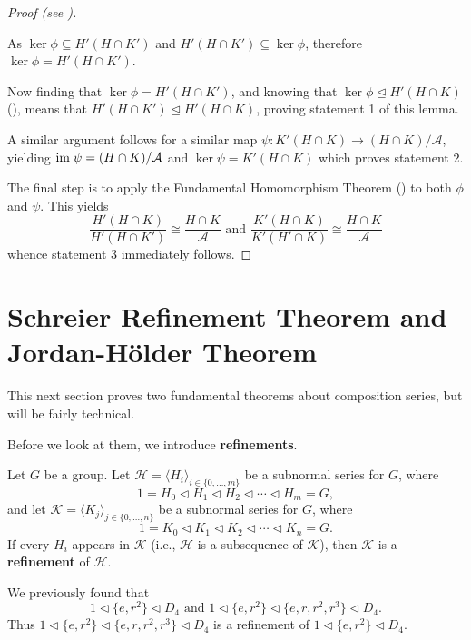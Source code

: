 \begin{proof}[Proof (see {\cite[p.~110]{hungerford_1980}})]
\begin{itemize}
        As $\ker\phi \subseteq H'(H\cap K')$ and $H'(H\cap K') \subseteq \ker\phi$, therefore $\ker\phi = H'(H \cap K')$.
    \end{itemize}
    
    Now finding that $\ker\phi = H'(H \cap K')$, and knowing that $\ker\phi \unlhd H'(H\cap K)$ (), means that $H'(H \cap K') \unlhd H'(H\cap K)$, proving statement 1 of this lemma.
    
    A similar argument follows for a similar map $\psi: K'(H\cap K) \to (H\cap K)/\mathcal{A}$, yielding $\mathrm{im}\;\psi = (H\cap K)/\mathcal{A}$ and $\ker\psi = K'(H\cap K)$ which proves statement 2.
    
    The final step is to apply the Fundamental Homomorphism Theorem () to both $\phi$ and $\psi$. This yields
    \[
        \frac{H'(H\cap K)}{H'(H\cap K')} \cong \frac{H\cap K}{\mathcal{A}} 
        \text{ and }
        \frac{K'(H\cap K)}{K'(H'\cap K)} \cong \frac{H\cap K}{\mathcal{A}}
    \]
    whence statement 3 immediately follows.
\end{proof}

\section{Schreier Refinement Theorem and Jordan-H\"older Theorem}
This next section proves two fundamental theorems about composition series, but will be fairly technical.

Before we look at them, we introduce \textbf{refinements}.
\begin{definition}
    Let $G$ be a group. Let $\mathcal{H} = \langle H_i \rangle_{i\in\{0,\dots,m\}}$ be a subnormal series for $G$, where
    \[
        1 = H_0 \lhd H_1 \lhd H_2 \lhd \cdots \lhd H_m = G,
    \]
    and let $\mathcal{K} = \langle K_j \rangle_{j\in\{0,\dots,n\}}$ be a subnormal series for $G$, where
    \[
        1 = K_0 \lhd K_1 \lhd K_2 \lhd \cdots \lhd K_n = G.
    \]
    If every $H_i$ appears in $\mathcal{K}$ (i.e., $\mathcal{H}$ is a subsequence of $\mathcal{K}$), then $\mathcal{K}$ is a \textbf{refinement} of $\mathcal{H}$.
\end{definition}
\begin{example}
    We previously found that
    \[
        1 \lhd \{e, r^2\} \lhd D_4 \text{ and } 1 \lhd \{e, r^2\} \lhd \{e, r, r^2, r^3\} \lhd D_4.    
    \]
    Thus $1 \lhd \{e, r^2\} \lhd \{e, r, r^2, r^3\} \lhd D_4$ is a refinement of $1 \lhd \{e, r^2\} \lhd D_4$.
\end{example}

